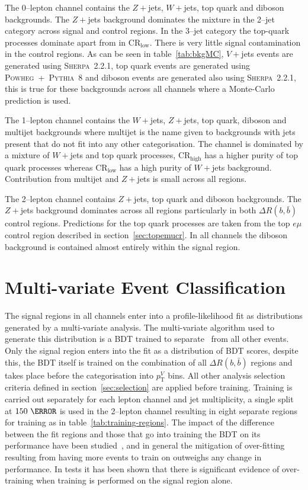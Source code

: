 The 0--lepton channel contains the $Z + $jets, $W+$jets, top quark and diboson
backgrounds. The $Z+$jets background dominates the mixture in the 2--jet
category across signal and control regions. In the 3--jet category the top-quark
processes dominate apart from in CR$_{\text{low}}$. There is very little signal
contamination in the control regions. As can be seen in table~\ref{tab:bkgMC},
$V+$jets events are generated using \textsc{Sherpa~2.2.1}, top quark events are
generated using \textsc{Powheg}~+~\textsc{Pythia~8} and diboson events are
generated also using \textsc{Sherpa~2.2.1}, this is true for these backgrounds
across all channels where a Monte-Carlo prediction is used.


The 1--lepton channel contains the $W+$jets, $Z+$jets, top quark, diboson and
multijet backgrounds where multijet is the name given to backgrounds with jets
present that do not fit into any other categorisation. The channel is dominated
by a mixture of $W+$jets and top quark processes, CR$_{\text{high}}$ has a
higher purity of top quark processes whereas CR$_{\text{low}}$ has a high purity
of $W+$jets background. Contribution from multijet and $Z+$jets is small across
all regions.

The 2--lepton channel contains $Z+$jets, top quark and diboson backgrounds. The
$Z+$jets background dominates across all regions particularly in both $\Delta
R(b, \bar{b})$ control regions. Predictions for the top quark processes are
taken from the top $e \mu$ control region described in
section~\ref{sec:topemucr}. In all channels the diboson background is contained
almost entirely within the signal region.

\section{Multi-variate Event Classification}%
\label{sec:mva}

The signal regions in all channels enter into a profile-likelihood fit as
distributions generated by a multi-variate analysis. The multi-variate algorithm
used to generate this distribution is a BDT trained to separate \VHbb\ from all
other events. Only the signal region enters into the fit as a distribution of
BDT scores, despite this, the BDT itself is trained on the combination of all
$\Delta R(b, \bar{b})$ regions and takes place before the categorisation into
$p_{\mathrm{T}}^V$ bins. All other analysis selection criteria defined in
section~\ref{sec:selection} are applied before training. Training is carried out
separately for each lepton channel and jet multiplicity, a single split at
$150~\GeV$ is used in the 2--lepton channel resulting in eight separate regions
for training as in table~\ref{tab:training-regions}. The impact of the
difference between the fit regions and those that go into training the BDT on
its performance have been studied~\cite{VHMainNote2019}, and in general the
mitigation of over-fitting resulting from having more events to train on
outweighs any change in performance.
 In tests it has been shown that
there is significant evidence of over-training when training is performed on the
signal region alone.

